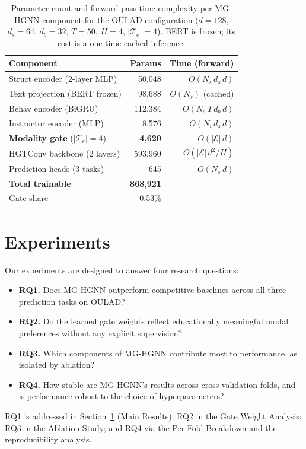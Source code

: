 \documentclass[sigconf,review]{acmart}
\begin{document}
\begin{table}[t]
\centering
\caption{Parameter count and forward-pass time
complexity per MG-HGNN component for the OULAD
configuration ($d{=}128$, $d_s{=}64$, $d_b{=}32$,
$T{=}50$, $H{=}4$, $|\mathcal{T}_e|{=}4$).
BERT is frozen; its cost is a one-time cached
inference.}
\label{tab:complexity}
\setlength{\tabcolsep}{5pt}
\begin{tabular}{lrr}
\toprule
\textbf{Component}
  & \textbf{Params}
  & \textbf{Time (forward)} \\
\midrule
Struct encoder (2-layer MLP) & 50{,}048
  & $O(N_s\, d_s\, d)$ \\
Text projection (BERT frozen) & 98{,}688
  & $O(N_s)$ (cached) \\
Behav encoder (BiGRU) & 112{,}384
  & $O(N_s\, T\, d_b\, d)$ \\
Instructor encoder (MLP) & 8{,}576
  & $O(N_i\, d_s\, d)$ \\
\textbf{Modality gate} ($|\mathcal{T}_e|{=}4$)
  & \textbf{4{,}620}
  & $O(|\mathcal{E}|\, d)$ \\
HGTConv backbone (2 layers) & 593{,}960
  & $O(|\mathcal{E}|\, d^2/H)$ \\
Prediction heads (3 tasks) & 645
  & $O(N_s\, d)$ \\
\midrule
\textbf{Total trainable} & \textbf{868{,}921} & \\
Gate share & 0.53\% & \\
\bottomrule
\end{tabular}
\end{table}

\section{Experiments}
\label{sec:experiments}

Our experiments are designed to answer four research
questions:
\begin{itemize}
  \item \textbf{RQ1.} Does MG-HGNN outperform
    competitive baselines across all three prediction
    tasks on OULAD?
  \item \textbf{RQ2.} Do the learned gate weights
    reflect educationally meaningful modal preferences
    without any explicit supervision?
  \item \textbf{RQ3.} Which components of MG-HGNN
    contribute most to performance, as isolated by
    ablation?
  \item \textbf{RQ4.} How stable are MG-HGNN's
    results across cross-validation folds, and is
    performance robust to the choice of
    hyperparameters?
\end{itemize}
RQ1 is addressed in Section~\ref{sec:experiments}
(Main Results); RQ2 in the Gate Weight Analysis;
RQ3 in the Ablation Study; and RQ4 via the Per-Fold
Breakdown and the reproducibility analysis.
\end{document}
